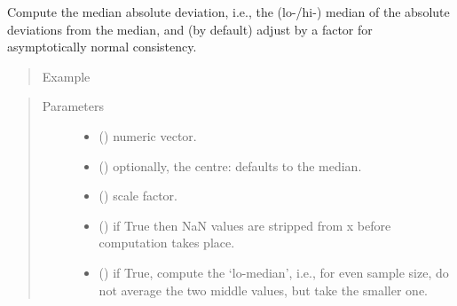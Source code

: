 \documentclass[letterpaper,10pt,english]{sphinxmanual}
\begin{document}
\begin{fulllineitems}
\label{\detokenize{_modules/lmrob:lmrob.utils.mad}}
Compute the median absolute deviation, i.e., the (lo-/hi-) median of the absolute deviations from the median, and (by default) adjust by a factor for asymptotically normal consistency.
\begin{quote}\begin{description}
\item[{Example}] \leavevmode
\end{description}\end{quote}

%
\begin{sphinxVerbatim}[commandchars=\\\{\}]
\PYG{p}{[}\PYG{p}{]}
\end{sphinxVerbatim}
\begin{quote}\begin{description}
\item[{Parameters}] \leavevmode\begin{itemize}
\item {} 
 () \textendash{} numeric vector.

\item {} 
 () \textendash{} optionally, the centre: defaults to the median.

\item {} 
 () \textendash{} scale factor.

\item {} 
 () \textendash{} if True then NaN values are stripped from x before computation takes place.

\item {} 
 () \textendash{} if True, compute the ‘lo-median’, i.e., for even sample size, do not average the two middle values, but take the smaller one.


\end{itemize}
\end{description}
\end{quote}
\end{fulllineitems}
\end{document}
